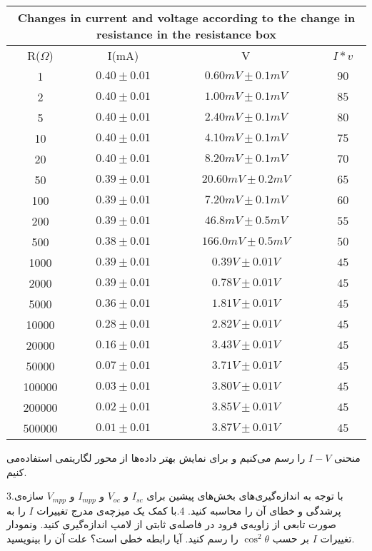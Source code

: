 \documentclass{article}
\begin{document}
\begin{latin}
\begin{center}
\begin{table}[h!]
				\begin{tabular}{|c|c|c|c|}
					\hline
					\multicolumn{4}{|c|}{Changes in current and voltage according to the change in resistance in the resistance box} \\
					\hline
					R($\Omega$) & I(mA) & V & $I*v$\\
					\hline
					1&$0.40\pm0.01$ &$0.60mV\pm0.1mV$& $90$ \\ 
					\hline
					2&$0.40\pm0.01$ &$1.00mV\pm0.1mV$& $85$ \\
					\hline
					5&$0.40\pm0.01$ &$2.40mV\pm0.1mV$& $80$ \\
					\hline
					10&$0.40\pm0.01$ &$4.10mV\pm0.1mV$& $75$ \\
					\hline
					20&$0.40\pm0.01$ &$8.20mV\pm0.1mV$& $70$ \\
					\hline
					50&$0.39\pm0.01$ &$20.60mV\pm0.2mV$& $65$ \\
					\hline
					100&$0.39\pm0.01$ &$7.20mV\pm0.1mV$& $60$ \\
					\hline
					200&$0.39\pm0.01$ &$46.8mV\pm0.5mV$& $55$ \\
					\hline
					500&$0.38\pm0.01$ &$166.0mV\pm0.5mV$& $50$ \\
					\hline
					1000&$0.39\pm0.01$ &$0.39V\pm0.01V$& $45$ \\
					\hline
					2000&$0.39\pm0.01$ &$0.78V\pm0.01V$& $45$ \\
					\hline
					5000&$0.36\pm0.01$ &$1.81V\pm0.01V$& $45$ \\
					\hline
					10000&$0.28\pm0.01$ &$2.82V\pm0.01V$& $45$ \\
					\hline
					20000&$0.16\pm0.01$ &$3.43V\pm0.01V$& $45$ \\
					\hline
					50000&$0.07\pm0.01$ &$3.71V\pm0.01V$& $45$ \\
					\hline
					100000&$0.03\pm0.01$ &$3.80V\pm0.01V$& $45$ \\
					\hline
					200000&$0.02\pm0.01$ &$3.85V\pm0.01V$& $45$ \\
					\hline
					500000&$0.01\pm0.01$ &$3.87V\pm0.01V$& $45$ \\
					\hline
				\end{tabular}
				\caption{}
			\end{table}
		\end{center}
	\end{latin}
	\newpage
	منحنی $I-V$ را رسم ‌می‌کنیم و برای نمایش بهتر داده‌ها از محور لگاریتمی استفاده‌می کنیم.
	
	\newpage
	3.با توجه به اندازه‌گیری‌های بخش‌های پیشین برای $I_{sc}$ و $V_{oc}$ و $I_{mpp}$ و $V_{mpp}$ سازه‌ی پرشدگی و خطای آن را محاسبه کنید. 
	\newpage
	4.با کمک یک میزچه‌ی مدرج تغییرات $I$ را به صورت تابعی از زاویه‌ی فرود در فاصله‌ی ثابتی از لامپ اندازه‌گیری کنید. ونمودار تغییرات $I$ بر حسب $\cos^2 {\theta}$ را رسم کنید. آیا رابطه خطی است؟ علت آن را بینویسید.
	
\end{document}
